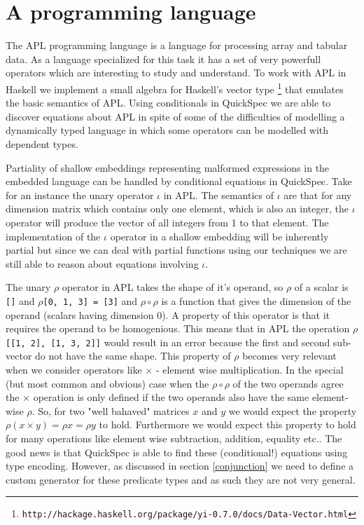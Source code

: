 \section{A programming language}\label{apl}
The APL programming language %
is a language for processing array and tabular data.
As a language specialized for this task it has a set of very powerfull
operators which are interesting to study and understand.
To work with APL in Haskell we implement a small
algebra for Haskell's vector type \footnote{\texttt{http://hackage.haskell.org/package/yi-0.7.0/docs/Data-Vector.html}}
that emulates the basic semantics of APL.
Using conditionals in QuickSpec we are able to discover
equations about APL in spite of some of the
difficulties of modelling a dynamically typed language
in which some operators can be modelled with dependent types.

Partiality of shallow embeddings representing malformed expressions in the
embedded language can be handled by conditional equations in QuickSpec.
Take for an instance the unary operator $\iota$ in APL. The semantics
of $\iota$ are that for any dimension matrix which contains only one element, which is also
an integer, the $\iota$ operator will produce the vector of all integers from 1 to that element.
The implementation of the $\iota$ operator in a shallow embedding will be inherently partial
but since we can deal with partial functions using our techniques we are still able to reason
about equations involving $\iota$.

The unary $\rho$ operator in APL takes the shape of it's operand,
so $\rho$ of a scalar is \texttt{[]} 
and $\rho$\texttt{[0, 1, 3] = [3]} and
$\rho\circ\rho$ is a function that gives the dimension of the operand (scalars having dimension 0).
A property of this operator is that it requires the operand to be homogenious.
This means that in APL the operation $\rho$\texttt{[[1, 2], [1, 3, 2]]}
would result in an error because the first and second sub-vector do not have the same shape.
This property of $\rho$ becomes very relevant when we consider operators like $\times$ - element wise
multiplication. In the special (but most common and obvious) case
when the $\rho\circ\rho$ of the two operands agree the $\times$ operation
is only defined if the two operands also have the same element-wise $\rho$. So, for two "well bahaved" matrices
$x$ and $y$ we would expect the property $\rho(x \times y) = \rho x = \rho y$ to hold. Furthermore
we would expect this property to hold for many operations like element wise subtraction, addition, equality etc..
The good news is that QuickSpec is able to find these (conditional!) equations using type encoding. However,
as discussed in section \ref{conjunction} we need to define a custom generator for these predicate types
and as such they are not very general.
